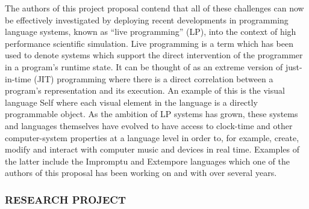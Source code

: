 \documentclass[a4paper,fontsize=12pt]{scrartcl}
\begin{document}
The authors of this project proposal contend that all of these
challenges can now be effectively investigated by deploying recent
developments in programming language systems, known as ``live
programming'' (LP), into the context of high performance scientific
simulation. Live programming is a term which has been used to denote
systems which support the direct intervention of the programmer in a
program's runtime state. It can be thought of as an extreme version of
just-in-time (JIT) programming where there is a direct correlation
between a program's representation and its execution. An example of
this is the visual language Self\cite{Ungar1987} where each visual
element in the language is a directly programmable object. As the
ambition of LP systems has grown, these systems and languages
themselves have evolved to have access to clock-time and other
computer-system properties at a language level in order to, for
example, create, modify and interact with computer music and devices
in real time. Examples of the latter include the
Impromptu\cite{Sorensen2005} and Extempore\cite{Sorensen} languages
which one of the authors of this proposal has been working on and with
over several years.


\subsubsection*{RESEARCH PROJECT}






\end{document}
